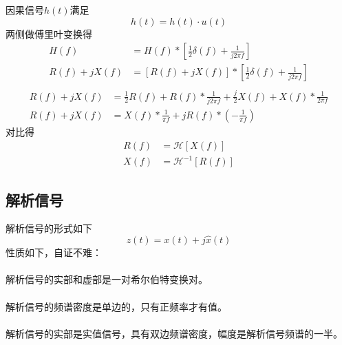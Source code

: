     \Proof
    因果信号$h(t)$满足
    \begin{equation}
        h(t)=h(t)\cdot u(t)
    \end{equation}
    两侧做傅里叶变换得
    \begin{equation*}
        \begin{split}
                  H(f)&=H(f)*\left[\frac{1}{2}\delta(f)+\frac{1}{j2\pi f}\right]\\
            R(f)+jX(f)&=[R(f)+jX(f)]*\left[\frac{1}{2}\delta(f)+\frac{1}{j2\pi f}\right]\\
        \end{split}
    \end{equation*}
    \begin{equation*}
        \begin{split}
            R(f)+jX(f)&=\frac{1}{2}R(f)+R(f)*\frac{1}{j2\pi f}+\frac{j}{2}X(f)+X(f)*\frac{1}{2\pi f}\\
            R(f)+jX(f)&=X(f)*\frac{1}{\pi f}+jR(f)*\left(-\frac{1}{\pi f}\right)
        \end{split}
    \end{equation*}
    对比得
    \begin{equation*}
        \begin{split}
            R(f)&=\mathscr{H}[X(f)]\\
            X(f)&=\mathscr{H}^{-1}[R(f)]
        \end{split}
    \end{equation*}

\subsection{解析信号}
    解析信号的形式如下
    \begin{equation}
        z(t)=x(t)+j\hat{x}(t)
    \end{equation}
    性质如下，自证不难：
    \paragraph{}解析信号的实部和虚部是一对希尔伯特变换对。
    
    \paragraph{}解析信号的频谱密度是单边的，只有正频率才有值。

    \paragraph{}解析信号的实部是实值信号，具有双边频谱密度，幅度是解析信号频谱的一半。

